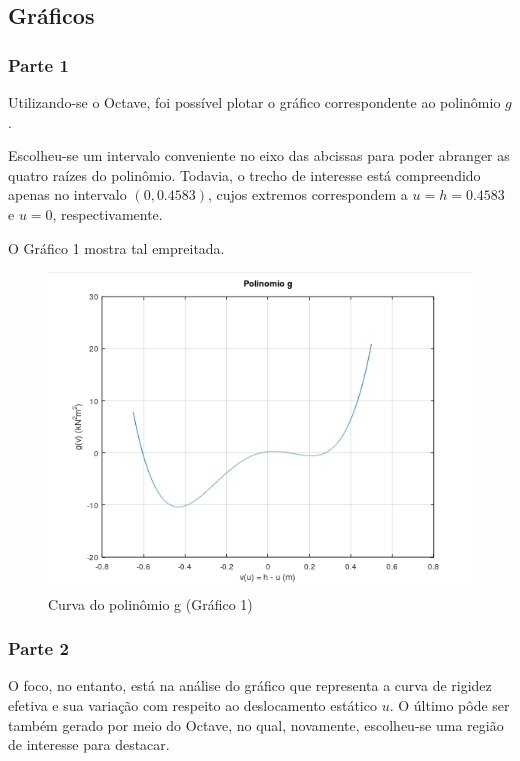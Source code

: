 \documentclass[a4paper, 12pt]{article}
\begin{document}
	\newpage
	
	\subsection{Gráficos}
	
	\subsubsection{Parte 1}
	
	Utilizando-se o Octave, foi possível plotar o gráfico correspondente ao polinômio $g$. 
	
	Escolheu-se um intervalo 
	conveniente no eixo das abcissas para poder abranger as quatro raízes do polinômio. Todavia, o trecho de interesse
	está compreendido apenas no intervalo $(0,0.4583)$, cujos extremos correspondem a $u=h=0.4583$ e $u=0$, respectivamente.
	
	O Gráfico 1 mostra tal empreitada.
	
	\begin{figure}[H]
		\centering
		\includegraphics[scale=1]{g1.png}
		\caption{Curva do polinômio g (Gráfico 1)}
	\end{figure}
	
	\subsubsection{Parte 2}
	
	O foco, no entanto, está na análise do gráfico que representa a curva de rigidez efetiva e sua variação com respeito 
	ao deslocamento	estático $u$. O último pôde ser também gerado por meio do Octave, no qual, novamente, escolheu-se uma 
	região de interesse	para destacar.
	
\end{document}
